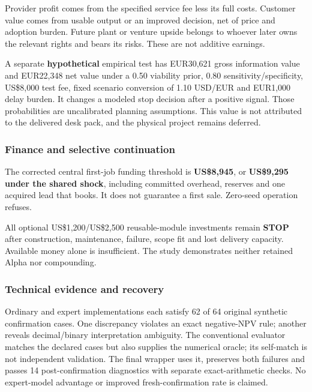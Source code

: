 \documentclass[
  10pt,
  letterpaper,
]{article}
\begin{document}
Provider profit comes from the specified service fee less its full
costs. Customer value comes from usable output or an improved decision,
net of price and adoption burden. Future plant or venture upside belongs
to whoever later owns the relevant rights and bears its risks. These are
not additive earnings.

A separate \textbf{hypothetical} empirical test has EUR30,621 gross
information value and EUR22,348 net value under a 0.50 viability prior,
0.80 sensitivity/specificity, US\$8,000 test fee, fixed scenario
conversion of 1.10 USD/EUR and EUR1,000 delay burden. It changes a
modeled stop decision after a positive signal. Those probabilities are
uncalibrated planning assumptions. This value is not attributed to the
delivered desk pack, and the physical project remains deferred.

\hypertarget{finance-and-selective-continuation}{%
\subsubsection{Finance and selective
continuation}\label{finance-and-selective-continuation}}

The corrected central first-job funding threshold is \textbf{US\$8,945},
or \textbf{US\$9,295 under the shared shock}, including committed
overhead, reserves and one acquired lead that books. It does not
guarantee a first sale. Zero-seed operation refuses.

All optional US\$1,200/US\$2,500 reusable-module investments remain
\textbf{STOP} after construction, maintenance, failure, scope fit and
lost delivery capacity. Available money alone is insufficient. The study
demonstrates neither retained Alpha nor compounding.

\hypertarget{technical-evidence-and-recovery}{%
\subsubsection{Technical evidence and
recovery}\label{technical-evidence-and-recovery}}

Ordinary and expert implementations each satisfy 62 of 64 original
synthetic confirmation cases. One discrepancy violates an exact
negative-NPV rule; another reveals decimal/binary interpretation
ambiguity. The conventional evaluator matches the declared cases but
also supplies the numerical oracle; its self-match is not independent
validation. The final wrapper uses it, preserves both failures and
passes 14 post-confirmation diagnostics with separate exact-arithmetic
checks. No expert-model advantage or improved fresh-confirmation rate is
claimed.
\end{document}
